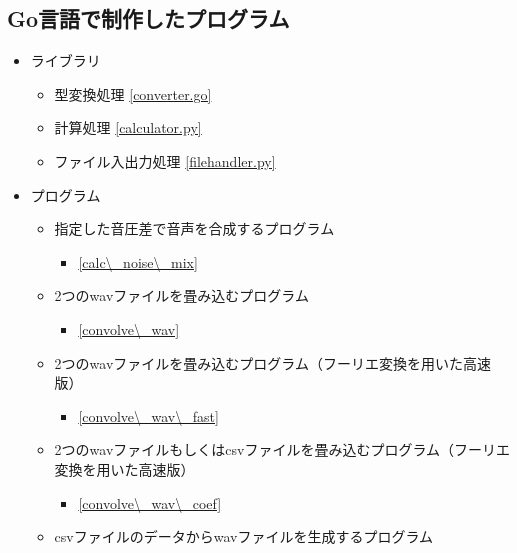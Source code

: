 \subsection{Go言語で制作したプログラム}\label{go}

\begin{itemize}
\tightlist

\item
  ライブラリ \\
  \begin{itemize}
  \tightlist
  \item
    型変換処理 \ref{converter.go}

  \item
    計算処理  \ref{calculator.py}

  \item
    ファイル入出力処理 \ref{filehandler.py}
  \end{itemize}

\item
  プログラム

  \begin{itemize}
  \tightlist
  \item
    指定した音圧差で音声を合成するプログラム

    \begin{itemize}
    \tightlist
    \item
      \ref{calc\_noise\_mix}
    \end{itemize}
  \item
    2つのwavファイルを畳み込むプログラム

    \begin{itemize}
    \tightlist
    \item
      \ref{convolve\_wav}
    \end{itemize}
  \item
    2つのwavファイルを畳み込むプログラム（フーリエ変換を用いた高速版）

    \begin{itemize}
    \tightlist
    \item
      \ref{convolve\_wav\_fast}
    \end{itemize}
  \item
    2つのwavファイルもしくはcsvファイルを畳み込むプログラム（フーリエ変換を用いた高速版）

    \begin{itemize}
    \tightlist
    \item
      \ref{convolve\_wav\_coef}
    \end{itemize}
  \item
    csvファイルのデータからwavファイルを生成するプログラム


\end{itemize}
\end{itemize}
